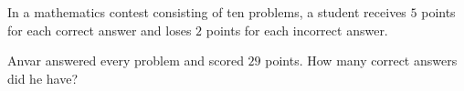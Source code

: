 In a mathematics contest consisting of ten problems, a student receives $5$ points for each correct answer and loses $2$ points for each incorrect answer.



Anvar answered every problem and scored $29$ points. How many correct answers did he have?

